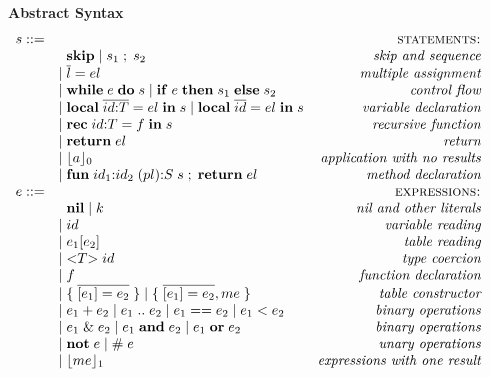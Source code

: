 \begin{figure}[!ht]
\textbf{Abstract Syntax}\\
\dstart
$$
\begin{array}{rlr}
s ::= & & \textsc{statements:}\\
& \;\; \mathbf{skip} \;
| \; s_{1} \; ; \; s_{2} & \textit{skip and sequence}\\
& | \; \overline{l} = el & \textit{multiple assignment}\\
& | \; \mathbf{while} \; e \; \mathbf{do} \; s \;
| \; \mathbf{if} \; e \; \mathbf{then} \; s_{1} \; \mathbf{else} \; s_{2} & \textit{control flow}\\
& | \; \mathbf{local} \; \overline{id{:}T} = el \; \mathbf{in} \; s \;
| \; \mathbf{local} \; \overline{id} = el \; \mathbf{in} \; s & \textit{variable declaration}\\
& | \; \mathbf{rec} \; id{:}T = f \; \mathbf{in} \; s & \textit{recursive function} \\
& | \; \mathbf{return} \; el & \textit{return} \\
& | \; \lfloor a \rfloor_{0} & \textit{application with no results}\\
& | \; \mathbf{fun} \; id_{1}{:}id_{2} \; (pl){:}S \; s \;;\; \mathbf{return} \; el & \textit{method declaration}\\
e ::= & & \textsc{expressions:}\\
& \;\; \mathbf{nil} \;
| \; k & \textit{nil and other literals}\\
& | \; id & \textit{variable reading}\\
& | \; e_{1}[e_{2}] & \textit{table reading}\\
& | \; {<}T{>} \; id & \textit{type coercion}\\
& | \; f & \textit{function declaration}\\
& | \; \{ \; \overline{[e_{1}] = e_{2}} \; \} \;
| \; \{ \; \overline{[e_{1}] = e_{2}},me \; \} & \textit{table constructor}\\
& | \; e_{1} + e_{2} \;
| \; e_{1} \; {..} \; e_{2} \;
| \; e_{1} == e_{2} \;
| \; e_{1} < e_{2} & \textit{binary operations}\\
& | \; e_{1} \;\&\; e_{2} \;
| \; e_{1} \; \mathbf{and} \; e_{2} \;
| \; e_{1} \; \mathbf{or} \; e_{2} & \textit{binary operations}\\
& | \; \mathbf{not} \; e \;
| \; \# \; e & \textit{unary operations} \\
& | \; \lfloor me \rfloor_{1} & \textit{expressions with one result}\\

\end{array}$$
\end{figure}
